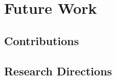 

\chapter{Future Work}

\ifpdf
    \graphicspath{{9_future_work/figures/PNG/}{9_future_work/figures/PDF/}{9_future_work/figures/}}
\else
    \graphicspath{{9_future_work/figures/EPS/}{9_future_work/figures/}}
\fi


\section{Contributions}

\section{Research Directions}






